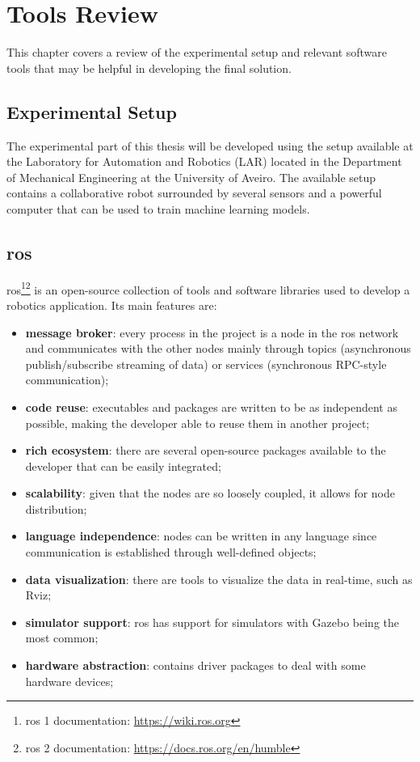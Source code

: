 \chapter{Tools Review}
\label{chapter:tools_review}

This chapter covers a review of the experimental setup and relevant software tools that may be helpful in developing the final solution.

\section{Experimental Setup}

The experimental part of this thesis will be developed using the setup available at the Laboratory for Automation and Robotics (LAR) located in the Department of Mechanical Engineering at the University of Aveiro. The available setup contains a collaborative robot surrounded by several sensors and a powerful computer that can be used to train machine learning models.

\section{\acf{ros}}

\acs{ros}\cite{ROS2}\footnote{\acs{ros} 1 documentation: \url{https://wiki.ros.org}}\footnote{\acs{ros} 2 documentation: \url{https://docs.ros.org/en/humble}} is an open-source collection of tools and software libraries used to develop a robotics application. Its main features are:

\begin{itemize}
    \item \textbf{message broker}: every process in the project is a node in the \acs{ros} network and communicates with the other nodes mainly through topics (asynchronous publish/subscribe streaming of data) or services (synchronous RPC-style communication);
    \item \textbf{code reuse}: executables and packages are written to be as independent as possible, making the developer able to reuse them in another project;
    \item \textbf{rich ecosystem}: there are several open-source packages available to the developer that can be easily integrated;
    \item \textbf{scalability}: given that the nodes are so loosely coupled, it allows for node distribution;
    \item \textbf{language independence}: nodes can be written in any language since communication is established through well-defined objects;
    \item \textbf{data visualization}: there are tools to visualize the data in real-time, such as Rviz;
    \item \textbf{simulator support}: \acs{ros} has support for simulators with Gazebo being the most common;
    \item \textbf{hardware abstraction}: contains driver packages to deal with some hardware devices;
\end{itemize}

